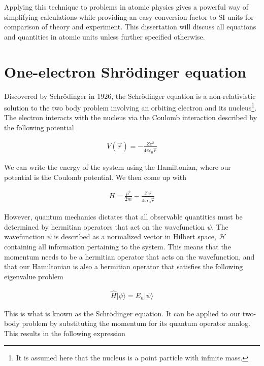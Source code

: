         Applying this technique to problems in atomic physics gives a powerful way of simplifying calculations while providing an easy conversion factor to SI units for comparison of theory and experiment. This dissertation will discuss all equations and quantities in atomic units unless further specified otherwise.


    \section{One-electron Shrödinger equation} \label{sec:Schrodinger_Equation}
        Discovered by Schrödinger in 1926, the Schrödinger equation is a non-relativistic solution to the two body problem involving an orbiting electron and its nucleus\footnote{It is assumed here that the nucleus is a point particle with infinite mass.}. The electron interacts with the nucleus via the Coulomb interaction described by the following potential

        \begin{align}
            V(\vec{r}) = -\frac{Z e^2}{4\pi \epsilon_0 \vec{r}}
        \end{align}

        \noindent We can write the energy of the system using the Hamiltonian, where our potential is the Coulomb potential. We then come up with 

        \begin{align}
            H = \frac{p^2}{2m} -\frac{Z e^2}{4\pi \epsilon_0 \vec{r}}
        \end{align}

        \noindent However, quantum mechanics dictates that all observable quantities must be determined by hermitian operators that act on the wavefunction $\psi$. The wavefunction $\psi$ is described as a normalized vector in Hilbert space, $\mathcal{H}$ containing all information pertaining to the system. This means that the momentum needs to be a hermitian operator that acts on the wavefunction, and that our Hamiltonian is also a hermitian operator that satisfies the following eigenvalue problem 

        \begin{align}
            \hat{H} \vert\psi \rangle = E_n \vert \psi \rangle
        \end{align}

        This is what is known as the Schrödinger equation. It can be applied to our two-body problem by substituting the momentum for its quantum operator analog. This results in the following expression 

